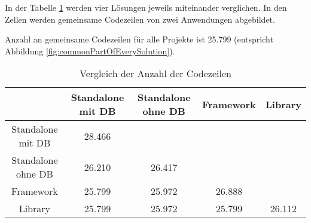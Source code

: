 In der Tabelle \ref{tab:compareLoC} werden vier Lösungen jeweils miteinander verglichen.
In den Zellen werden gemeinsame Codezeilen von zwei Anwendungen abgebildet.

Anzahl an gemeinsame Codezeilen für alle Projekte ist 25.799 (entspricht Abbildung \ref{fig:commonPartOfEverySolution}). 

\begin{table}[h!]
    \centering
    \begin{tabular}{|c|c| c| c| c| }
    \hline
                        & Standalone mit DB & Standalone ohne DB    & Framework & Library \\ 
    \hline
    Standalone mit DB   & 28.466             &                       &           & \\  
    \hline
    Standalone ohne DB  & 26.210             & 26.417                 &           & \\  
    \hline
    Framework           & 25.799             & 25.972                 & 26.888     & \\  
    \hline
    Library             & 25.799             & 25.972                 & 25.799     & 26.112 \\
    \hline
    \end{tabular}
    \caption{Vergleich der Anzahl der Codezeilen}
    \label{tab:compareLoC}
\end{table}